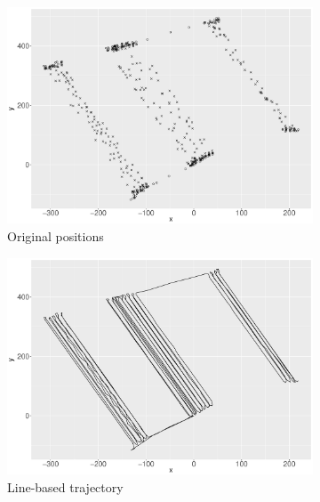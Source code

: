 \begin{figure}
\centering
    \begin{subfigure}{0.45\textwidth}
    \centering
    \includegraphics[width=\textwidth]{Chapters/02TractorSplineTheory/plot/ggplot/gg512Points.pdf}
    \caption{Original positions}\label{gg512Points}
    \end{subfigure}%
    \begin{subfigure}{0.45\textwidth}
    \centering
    \includegraphics[width=\textwidth]{Chapters/02TractorSplineTheory/plot/ggplot/gg512Path.pdf}
    \caption{Line-based trajectory}\label{gg512Path}
    \end{subfigure}
    \begin{subfigure}{0.45\textwidth}
    \centering

\end{subfigure}
\end{figure}
